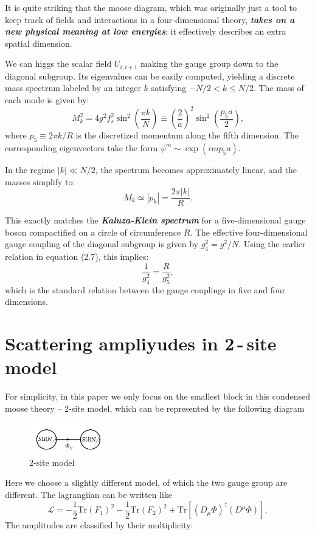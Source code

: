 \documentclass[12pt]{article}
\numberwithin{equation}{section}
\newcommand{\tif}[1]{\textit{\textbf{#1}}}
\begin{document}
    It is quite striking that the moose diagram, which was originally just a tool to keep track of fields and interactions in a four-dimensional theory, \tif{takes on a new physical meaning at low energies}: it effectively describes an extra spatial dimension.

We can higgs the scalar field $U_{i,i+1}$ making the gauge group down to the diagonal subgroup. Its eigenvalues can be easily computed, yielding a discrete mass spectrum labeled by an integer $k$ satisfying $-N/2 < k \leq N/2$. The mass of each mode is given by:
\begin{equation}
M_k^2 = 4g^2 f_s^2 \sin^2\left( \frac{\pi k}{N} \right)
\equiv \left( \frac{2}{a} \right)^2 \sin^2\left( \frac{p_5 a}{2} \right),
\end{equation}
where $p_5 \equiv 2\pi k / R$ is the discretized momentum along the fifth dimension. The corresponding eigenvectors take the form $\psi^m \sim \exp(i m p_5 a)$.

In the regime $|k| \ll N/2$, the spectrum becomes approximately linear, and the masses simplify to:
\begin{equation}
M_k \simeq |p_k| = \frac{2\pi |k|}{R}.
\end{equation}

This exactly matches the \tif{Kaluza-Klein spectrum} for a five-dimensional gauge boson compactified on a circle of circumference $R$. The effective four-dimensional gauge coupling of the diagonal subgroup is given by $g_4^2 = g^2 / N$. Using the earlier relation in equation (2.7), this implies:
\begin{equation}
\frac{1}{g_4^2} = \frac{R}{g_5^2},
\end{equation}
which is the standard relation between the gauge couplings in five and four dimensions.

\section{Scattering ampliyudes in 2\,-\,site model}
For simplicity, in this paper we only focus on the smallest block in this condensed moose theory -- 2-site model, which can be represented by the following diagram 
\begin{figure}[H]
    \centering
    \includegraphics[width=0.3\textwidth]{2-site.png}
    \caption{2-site model}
\end{figure}
\noindent
Here we choose a slightly different model, of which the two gauge group are different. The lagrangiian can be written like 
\begin{equation}
    \mathcal{L}=-\frac{1}{2}\mathrm{Tr}(F_1)^2-\frac{1}{2}\mathrm{Tr}(F_2)^2+\mathrm{Tr}[(D_\mu\Phi)^\dagger(D^\mu\Phi)],
\end{equation}
The amplitudes are classified by their multiplicity:
\end{document}
